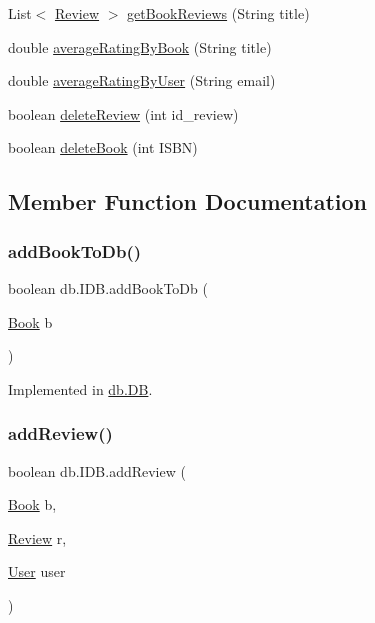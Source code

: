 \begin{DoxyCompactItemize}
\item 
List$<$ \hyperlink{classserver_1_1data_1_1_review}{Review} $>$ \hyperlink{interfacedb_1_1_i_d_b_a6b8fda48df77b542b8713bc4f035bccf}{get\+Book\+Reviews} (String title)
\item 
double \hyperlink{interfacedb_1_1_i_d_b_a4d23da2e383e7fe0638089fb2686b6c3}{average\+Rating\+By\+Book} (String title)
\item 
double \hyperlink{interfacedb_1_1_i_d_b_a5bb2209c976ab0a7f20606ed5df0e0cf}{average\+Rating\+By\+User} (String email)
\item 
boolean \hyperlink{interfacedb_1_1_i_d_b_a37810242fa48895f21f790ef6a367225}{delete\+Review} (int id\+\_\+review)
\item 
boolean \hyperlink{interfacedb_1_1_i_d_b_a8fa065455c75f33b9713b8d5058a0e30}{delete\+Book} (int I\+S\+BN)
\end{DoxyCompactItemize}


\subsection{Member Function Documentation}
\mbox{\label{interfacedb_1_1_i_d_b_a63904b26597f651ea6acbd03384e0afb}} 
\subsubsection{\texorpdfstring{add\+Book\+To\+Db()}{addBookToDb()}}
{\footnotesize\ttfamily boolean db.\+I\+D\+B.\+add\+Book\+To\+Db (\begin{DoxyParamCaption}\item[{\hyperlink{classserver_1_1data_1_1_book}{Book}}]{b }\end{DoxyParamCaption})}



Implemented in \hyperlink{classdb_1_1_d_b_a705ed9c0ffae567ec3ac09fbd7138c6f}{db.\+DB}.

\mbox{\label{interfacedb_1_1_i_d_b_a00a453c6d4fc604615f5a173d86600fc}} 
\subsubsection{\texorpdfstring{add\+Review()}{addReview()}}
{\footnotesize\ttfamily boolean db.\+I\+D\+B.\+add\+Review (\begin{DoxyParamCaption}\item[{\hyperlink{classserver_1_1data_1_1_book}{Book}}]{b,  }\item[{\hyperlink{classserver_1_1data_1_1_review}{Review}}]{r,  }\item[{\hyperlink{classserver_1_1data_1_1_user}{User}}]{user }\end{DoxyParamCaption})}



